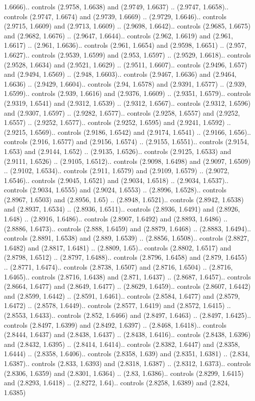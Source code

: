 1.6666).. controls (2.9758, 1.6638) and (2.9749, 1.6637) .. (2.9747, 1.6658).. controls (2.9747, 1.6674) and (2.9739, 1.6669) .. (2.9729, 1.6646).. controls (2.9715, 1.6609) and (2.9713, 1.6609) .. (2.9698, 1.6642).. controls (2.9685, 1.6675) and (2.9682, 1.6676) .. (2.9647, 1.6644).. controls (2.962, 1.6619) and (2.961, 1.6617) .. (2.961, 1.6636).. controls (2.961, 1.6654) and (2.9598, 1.6651) .. (2.957, 1.6627).. controls (2.9539, 1.6599) and (2.953, 1.6597) .. (2.9529, 1.6618).. controls (2.9528, 1.6634) and (2.9521, 1.6629) .. (2.9511, 1.6607).. controls (2.9496, 1.657) and (2.9494, 1.6569) .. (2.948, 1.6603).. controls (2.9467, 1.6636) and (2.9464, 1.6636) .. (2.9429, 1.6604).. controls (2.94, 1.6578) and (2.9391, 1.6577) .. (2.939, 1.6599).. controls (2.939, 1.6616) and (2.9376, 1.6609) .. (2.9351, 1.6579).. controls (2.9319, 1.6541) and (2.9312, 1.6539) .. (2.9312, 1.6567).. controls (2.9312, 1.6596) and (2.9307, 1.6597) .. (2.9282, 1.6577).. controls (2.9258, 1.6557) and (2.9252, 1.6557) .. (2.9252, 1.6577).. controls (2.9252, 1.6595) and (2.9241, 1.6592) .. (2.9215, 1.6569).. controls (2.9186, 1.6542) and (2.9174, 1.6541) .. (2.9166, 1.656).. controls (2.916, 1.6577) and (2.9156, 1.6574) .. (2.9155, 1.6551).. controls (2.9154, 1.653) and (2.9144, 1.652) .. (2.9135, 1.6526).. controls (2.9125, 1.6533) and (2.9111, 1.6526) .. (2.9105, 1.6512).. controls (2.9098, 1.6498) and (2.9097, 1.6509) .. (2.9102, 1.6534).. controls (2.911, 1.6579) and (2.9109, 1.6579) .. (2.9072, 1.6546).. controls (2.9045, 1.6521) and (2.9034, 1.6518) .. (2.9034, 1.6537).. controls (2.9034, 1.6555) and (2.9024, 1.6553) .. (2.8996, 1.6528).. controls (2.8967, 1.6503) and (2.8956, 1.65) .. (2.8948, 1.6521).. controls (2.8942, 1.6538) and (2.8937, 1.6534) .. (2.8936, 1.6511).. controls (2.8936, 1.6491) and (2.8926, 1.648) .. (2.8916, 1.6486).. controls (2.8907, 1.6492) and (2.8893, 1.6486) .. (2.8886, 1.6473).. controls (2.888, 1.6459) and (2.8879, 1.6468) .. (2.8883, 1.6494).. controls (2.8891, 1.6538) and (2.889, 1.6539) .. (2.8856, 1.6508).. controls (2.8827, 1.6482) and (2.8817, 1.6481) .. (2.8809, 1.65).. controls (2.8802, 1.6517) and (2.8798, 1.6512) .. (2.8797, 1.6488).. controls (2.8796, 1.6458) and (2.879, 1.6455) .. (2.8771, 1.6474).. controls (2.8738, 1.6507) and (2.8716, 1.6504) .. (2.8716, 1.6465).. controls (2.8716, 1.6438) and (2.871, 1.6437) .. (2.8687, 1.6457).. controls (2.8664, 1.6477) and (2.8649, 1.6477) .. (2.8629, 1.6459).. controls (2.8607, 1.6442) and (2.8599, 1.6442) .. (2.8591, 1.6461).. controls (2.8584, 1.6477) and (2.8579, 1.6472) .. (2.8578, 1.6449).. controls (2.8577, 1.6419) and (2.8572, 1.6415) .. (2.8553, 1.6433).. controls (2.852, 1.6466) and (2.8497, 1.6463) .. (2.8497, 1.6425).. controls (2.8497, 1.6399) and (2.8492, 1.6397) .. (2.8468, 1.6418).. controls (2.8444, 1.6437) and (2.8438, 1.6437) .. (2.8438, 1.6416).. controls (2.8438, 1.6396) and (2.8432, 1.6395) .. (2.8414, 1.6414).. controls (2.8382, 1.6447) and (2.8358, 1.6444) .. (2.8358, 1.6406).. controls (2.8358, 1.639) and (2.8351, 1.6381) .. (2.834, 1.6387).. controls (2.833, 1.6393) and (2.8318, 1.6387) .. (2.8312, 1.6373).. controls (2.8306, 1.6359) and (2.8301, 1.6364) .. (2.83, 1.6386).. controls (2.8299, 1.6415) and (2.8293, 1.6418) .. (2.8272, 1.64).. controls (2.8258, 1.6389) and (2.824, 1.6385) 